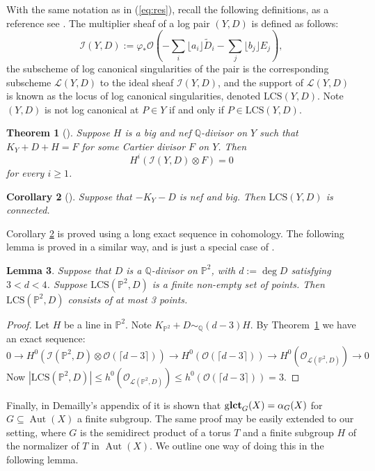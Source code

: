 \documentclass{amsart}
\newtheorem{theorem}{Theorem}[section]
\newtheorem{lemma}[theorem]{Lemma}
\newtheorem{corollary}[theorem]{Corollary}
{\theoremstyle{remark}
\newtheorem{remark}[theorem]{Remark}
\newtheorem{remarks}[theorem]{Remarks}
\newtheorem{notation}[theorem]{Notation}
}
\theoremstyle{definition}
\renewcommand{\L}{\mathcal{L}}
\newcommand{\QQ}{\mathbb{Q}}
\newcommand{\PP}{\mathbb{P}}
\newcommand{\LCS}{\text{LCS}}
\DeclareMathOperator{\Aut}{Aut}
\DeclareMathOperator{\glct}{g\bf{lct}}
\begin{document}
With the same notation as in (\ref{eq:res}), recall the following definitions, as a reference see \cite{positivity}. The multiplier sheaf of a log pair \((Y,D)\) is defined as follows:
\[
\mathcal{I}(Y,D) := \varphi_* \mathcal{O} \left( -\sum_i \lfloor a_i \rfloor \tilde{D}_i  -\sum_j \lfloor b_j \rfloor {E}_j \right),
\]
the subscheme of log canonical singularities of the pair is the corresponding subscheme \(\L(Y,D)\) to the ideal sheaf \(\mathcal{I}(Y,D)\), and the support of \(\L(Y,D)\) is known as the locus of log canonical singularities, denoted \(\LCS(Y,D)\). Note \((Y,D)\) is not log canonical at \(P \in Y\) if and only if \(P \in \LCS(Y,D)\).
\begin{theorem}[{\cite[Theorem 9.4.8]{positivity}}] \label{thm:nadelvanish}
Suppose \(H\) is a big and nef \(\QQ\)-divisor on \(Y\) such that \(K_Y+D+H=F\) for some Cartier divisor \(F\) on \(Y\). Then
\[
H^i\left( \mathcal{I}(Y,D) \otimes F \right) = 0
\]
for every \(i \ge 1\).
\end{theorem}
\begin{corollary}[{\cite[Lemma 5.7]{shokurov}}] \label{cor:connect}
Suppose that \(-K_Y -D \) is nef and big. Then \(\LCS(Y,D)\) is connected.
\end{corollary}
Corollary \ref{cor:connect} is proved using a long exact sequence in cohomology. The following lemma is proved in a similar way, and is just a special case of \cite[Lemma 2.9]{cheltsov2011exceptional}.
\begin{lemma} \label{lem:threepoint}
Suppose that \(D\) is a \(\QQ\)-divisor on \(\PP^2\), with \(d:= \deg D\) satisfying \(3< d < 4\). Suppose \(\LCS(\PP^2,D)\) is a finite non-empty set of points. Then \(\LCS(\PP^2,D)\) consists of at most 3 points.
\end{lemma}
\begin{proof}
Let \(H\) be a line in \(\PP^2\). Note \(K_{\PP^2} + D \sim_\QQ (d - 3) H\). By Theorem~\ref{thm:nadelvanish} we have an exact sequence:
\[
0 \to H^0 ( \mathcal{I}(\PP^2,D) \otimes \mathcal{O}(\lceil d - 3 \rceil) ) \to H^0 ( \mathcal{O}(\lceil d - 3 \rceil) ) \to H^0(\mathcal{O}_{\L(\PP^2,D)}) \to 0
\]
Now \(|\LCS(\PP^2,D)| \le h^0(\mathcal{O}_{\L(\PP^2,D)}) \le h^0(\mathcal{O}(\lceil d-3 \rceil)) = 3\).
\end{proof}
Finally, in Demailly's appendix of \cite{cheltsov08} it is shown that \(\glct_{G}(X) = \alpha_G(X)\) for \(G \subseteq \Aut(X)\) a finite subgroup. The same proof may be easily extended to our setting, where \(G\) is the semidirect product of a torus \(T\) and a finite subgroup  \(H\) of the normalizer of \(T\) in \(\Aut(X)\). We outline one way of doing this in the following lemma.
\end{document}
